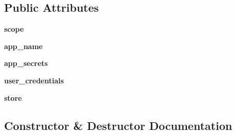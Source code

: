 \subsection*{Public Attributes}
\begin{DoxyCompactItemize}
\item 
{\bfseries scope}\hypertarget{classhal_1_1internet_1_1google_1_1gauthenticator_1_1_google_api_o_auth_a9681974412472e673a1e86128c11ebc9}{}\label{classhal_1_1internet_1_1google_1_1gauthenticator_1_1_google_api_o_auth_a9681974412472e673a1e86128c11ebc9}

\item 
{\bfseries app\+\_\+name}\hypertarget{classhal_1_1internet_1_1google_1_1gauthenticator_1_1_google_api_o_auth_ad9a2595e30bae9341f0a9c72b67168b9}{}\label{classhal_1_1internet_1_1google_1_1gauthenticator_1_1_google_api_o_auth_ad9a2595e30bae9341f0a9c72b67168b9}

\item 
{\bfseries app\+\_\+secrets}\hypertarget{classhal_1_1internet_1_1google_1_1gauthenticator_1_1_google_api_o_auth_a4d60c8f1fe1e8e4ea2878b1119e7ebd8}{}\label{classhal_1_1internet_1_1google_1_1gauthenticator_1_1_google_api_o_auth_a4d60c8f1fe1e8e4ea2878b1119e7ebd8}

\item 
{\bfseries user\+\_\+credentials}\hypertarget{classhal_1_1internet_1_1google_1_1gauthenticator_1_1_google_api_o_auth_a73b05f3891b58cbf19d199c7b9795bdb}{}\label{classhal_1_1internet_1_1google_1_1gauthenticator_1_1_google_api_o_auth_a73b05f3891b58cbf19d199c7b9795bdb}

\item 
{\bfseries store}\hypertarget{classhal_1_1internet_1_1google_1_1gauthenticator_1_1_google_api_o_auth_a2cd8e22eff6aece5aaafad038e8cd5bd}{}\label{classhal_1_1internet_1_1google_1_1gauthenticator_1_1_google_api_o_auth_a2cd8e22eff6aece5aaafad038e8cd5bd}

\end{DoxyCompactItemize}


\subsection{Constructor \& Destructor Documentation}
